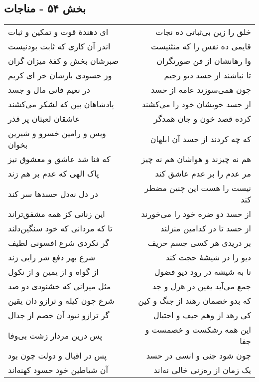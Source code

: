 \begin{center}
\section*{بخش ۵۴ - مناجات}
\label{sec:sh054}
\begin{longtable}{l p{0.5cm} r}
ای دهندهٔ قوت و تمکین و ثبات
&&
خلق را زین بی‌ثباتی ده نجات
\\
اندر آن کاری که ثابت بودنیست
&&
قایمی ده نفس را که منثنیست
\\
صبرشان بخش و کفهٔ میزان گران
&&
وا رهانشان از فن صورتگران
\\
وز حسودی بازشان خر ای کریم
&&
تا نباشند از حسد دیو رجیم
\\
در نعیم فانی مال و جسد
&&
چون همی‌سوزند عامه از حسد
\\
پادشاهان بین که لشکر می‌کشند
&&
از حسد خویشان خود را می‌کشند
\\
عاشقان لعبتان پر قذر
&&
کرده قصد خون و جان همدگر
\\
ویس و رامین خسرو و شیرین بخوان
&&
که چه کردند از حسد آن ابلهان
\\
که فنا شد عاشق و معشوق نیز
&&
هم نه چیزند و هواشان هم نه چیز
\\
پاک الهی که عدم بر هم زند
&&
مر عدم را بر عدم عاشق کند
\\
در دل نه‌دل حسدها سر کند
&&
نیست را هست این چنین مضطر کند
\\
این زنانی کز همه مشفق‌تراند
&&
از حسد دو ضره خود را می‌خورند
\\
تا که مردانی که خود سنگین‌دلند
&&
از حسد تا در کدامین منزلند
\\
گر نکردی شرع افسونی لطیف
&&
بر دریدی هر کسی جسم حریف
\\
شرع بهر دفع شر رایی زند
&&
دیو را در شیشهٔ حجت کند
\\
از گواه و از یمین و از نکول
&&
تا به شیشه در رود دیو فضول
\\
مثل میزانی که خشنودی دو ضد
&&
جمع می‌آید یقین در هزل و جد
\\
شرع چون کیله و ترازو دان یقین
&&
که بدو خصمان رهند از جنگ و کین
\\
گر ترازو نبود آن خصم از جدال
&&
کی رهد از وهم حیف و احتیال
\\
پس درین مردار زشت بی‌وفا
&&
این همه رشکست و خصمست و جفا
\\
پس در اقبال و دولت چون بود
&&
چون شود جنی و انسی در حسد
\\
آن شیاطین خود حسود کهنه‌اند
&&
یک زمان از ره‌زنی خالی نه‌اند
\\

\end{longtable}
\end{center}
